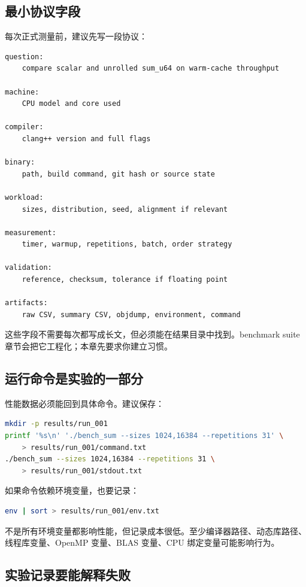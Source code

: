 \subsection{最小协议字段}

每次正式测量前，建议先写一段协议：

\begin{lstlisting}
question:
    compare scalar and unrolled sum_u64 on warm-cache throughput

machine:
    CPU model and core used

compiler:
    clang++ version and full flags

binary:
    path, build command, git hash or source state

workload:
    sizes, distribution, seed, alignment if relevant

measurement:
    timer, warmup, repetitions, batch, order strategy

validation:
    reference, checksum, tolerance if floating point

artifacts:
    raw CSV, summary CSV, objdump, environment, command
\end{lstlisting}

这些字段不需要每次都写成长文，但必须能在结果目录中找到。benchmark suite 章节会把它工程化；本章先要求你建立习惯。

\subsection{运行命令是实验的一部分}

性能数据必须能回到具体命令。建议保存：

\begin{lstlisting}[language=bash]
mkdir -p results/run_001
printf '%s\n' './bench_sum --sizes 1024,16384 --repetitions 31' \
    > results/run_001/command.txt
./bench_sum --sizes 1024,16384 --repetitions 31 \
    > results/run_001/stdout.txt
\end{lstlisting}

如果命令依赖环境变量，也要记录：

\begin{lstlisting}[language=bash]
env | sort > results/run_001/env.txt
\end{lstlisting}

不是所有环境变量都影响性能，但记录成本很低。至少编译器路径、动态库路径、线程库变量、OpenMP 变量、BLAS 变量、CPU 绑定变量可能影响行为。

\subsection{实验记录要能解释失败}

